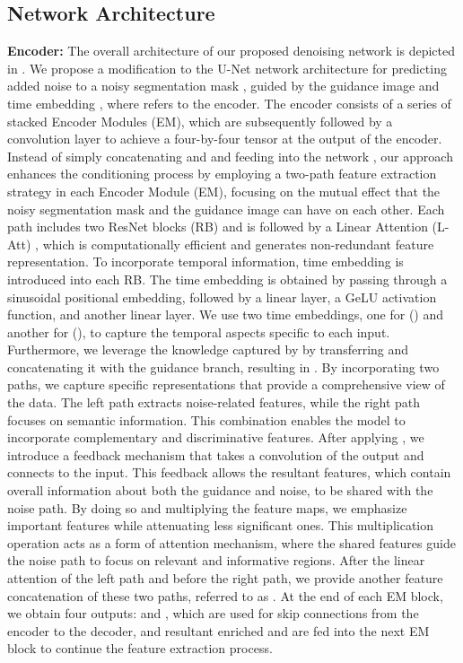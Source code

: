 \documentclass[runningheads]{llncs}
\begin{document}
\subsection{Network Architecture}
\noindent\textbf{Encoder:} The overall architecture of our proposed denoising network is depicted in . We propose a modification to the U-Net network architecture for predicting added noise  to a noisy segmentation mask , guided by the guidance image  and time embedding , where  refers to the  encoder. The encoder consists of a series of stacked Encoder Modules (EM), which are subsequently followed by a convolution layer to achieve a four-by-four tensor at the output of the encoder. Instead of simply concatenating  and  and feeding into the network \cite{wolleb2022diffusion}, our approach enhances the conditioning process by employing a two-path feature extraction strategy in each Encoder Module (EM), focusing on the mutual effect that the noisy segmentation mask and the guidance image can have on each other. Each path includes two ResNet blocks (RB) and is followed by a Linear Attention (L-Att) \cite{shen2021efficient}, which is computationally efficient and generates non-redundant feature representation. To incorporate temporal information, time embedding is introduced into each RB. The time embedding is obtained by passing  through a sinusoidal positional embedding, followed by a linear layer, a GeLU activation function, and another linear layer. We use two time embeddings, one for  () and another for  (), to capture the temporal aspects specific to each input. Furthermore, we leverage the knowledge captured by  by transferring and concatenating it with the guidance branch, resulting in . By incorporating two paths, we capture specific representations that provide a comprehensive view of the data. The left path extracts noise-related features, while the right path focuses on semantic information. This combination enables the model to incorporate complementary and discriminative features. After applying , we introduce a feedback mechanism that takes a convolution of the  output and connects to the  input. This feedback allows the resultant features, which contain overall information about both the guidance and noise, to be shared with the noise path. By doing so and multiplying the feature maps, we emphasize important features while attenuating less significant ones. This multiplication operation acts as a form of attention mechanism, where the shared features guide the noise path to focus on relevant and informative regions. After the linear attention of the left path and before the right path, we provide another feature concatenation of these two paths, referred to as . At the end of each EM block, we obtain four outputs:  and , which are used for skip connections from the encoder to the decoder, and resultant enriched  and  are fed into the next EM block to continue the feature extraction process.
\end{document}
